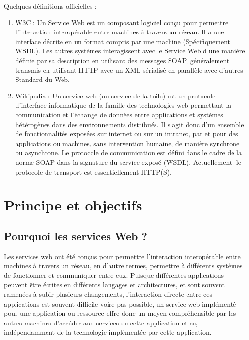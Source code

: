 	Quelques définitions officielles :
			\begin{enumerate}
			\item W3C :
			Un Service Web est un composant logiciel conçu pour permettre l'interaction interopérable entre machines à travers un réseau. Il a une interface décrite en un format compris par une machine (Spécifiquement WSDL). Les autres systèmes interagissent avec le Service Web d'une manière définie par sa description en utilisant des messages SOAP, généralement transmis en utilisant HTTP avec un XML sérialisé en parallèle avec d'autres Standard du Web.\cite{W3}
			\item Wikipedia : Un service web (ou service de la toile) est un protocole d'interface informatique de la famille des technologies web permettant la communication et l'échange de données entre applications et systèmes hétérogènes dans des environnements distribués. Il s'agit donc d'un ensemble de fonctionnalités exposées sur internet ou sur un intranet, par et pour des applications ou machines, sans intervention humaine, de manière synchrone ou asynchrone. Le protocole de communication est défini dans le cadre de la norme SOAP dans la signature du service exposé (WSDL). Actuellement, le protocole de transport est essentiellement HTTP(S).\cite{Wikipedia}
			\end{enumerate}

		\section{Principe et objectifs}
		\subsection{Pourquoi les services Web ?}
		Les services web ont été conçus pour permettre l'interaction interopérable entre machines à travers un réseau, en d'autre termes, permettre à différents systèmes de fonctionner et communiquer entre eux.\newline
Puisque différentes applications peuvent être écrites en différents langages et architectures, et sont souvent ramenées à subir plusieurs changements, l’interaction directe entre ces applications est souvent difficile voire pas possible, un service web implémenté pour une application ou ressource offre donc un moyen compréhensible par les autres machines d'accéder aux services de cette application et ce, indépendamment de la technologie implémentée par cette application.
\cite{refTutorialPointsWS}

